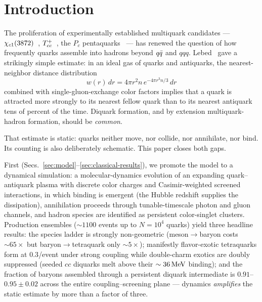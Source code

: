 \section{Introduction}
\label{sec:intro}


The proliferation of experimentally established multiquark candidates ---
$\chi_{c1}(3872)$~\cite{Choi:2003ue,LHCb:2020xds,CMS:2021znk}, $T_{cc}^{+}$~\cite{LHCb:2021vvq,LHCb:2021auc},
the $P_c$ pentaquarks~\cite{LHCb:2015yax,LHCb:2019kea} --- has renewed the
question of how frequently quarks assemble into hadrons beyond $q\bar{q}$ and
$qqq$.  Lebed~\cite{Lebed:2016jvq} gave a strikingly simple estimate:
in an ideal gas of quarks and antiquarks, the nearest-neighbor distance
distribution~\cite{Chandrasekhar:1943ws}
\begin{equation}
w(r)\,dr = 4\pi r^2 n\, e^{-4\pi r^3 n/3}\, dr
\label{eq:nn}
\end{equation}
combined with single-gluon-exchange color factors implies that a quark is
attracted more strongly to its nearest fellow quark than to its nearest
antiquark tens of percent of the time.  Diquark formation, and by extension
multiquark-hadron formation, should be \emph{common}.

That estimate is static: quarks neither move, nor collide, nor annihilate,
nor bind.  Its counting is also deliberately schematic.  This paper closes
both gaps.

First (Secs.~\ref{sec:model}--\ref{sec:classical-results}), we promote
the model to a dynamical simulation: a molecular-dynamics evolution of
an expanding quark--antiquark plasma with discrete color charges and
Casimir-weighted screened interactions, in which binding is emergent
(the Hubble redshift supplies the dissipation), annihilation proceeds
through tunable-timescale photon and gluon channels, and hadron species
are identified as persistent color-singlet clusters.  Production
ensembles ($\sim1100$ events up to $N=10^4$ quarks) yield three
headline results: the species ladder is strongly non-geometric
(meson$\to$baryon costs $\sim65\times$ but baryon$\to$tetraquark only
$\sim5\times$); manifestly flavor-exotic tetraquarks form at
$0.3$/event under strong coupling while double-charm exotics are
doubly suppressed (seeded $cc$ diquarks melt above their
$\sim36\,\mathrm{MeV}$ binding); and the fraction of baryons assembled through
a persistent diquark intermediate is $0.91$--$0.95\pm0.02$ across the
entire coupling--screening plane --- dynamics \emph{amplifies} the
static estimate by more than a factor of three.

